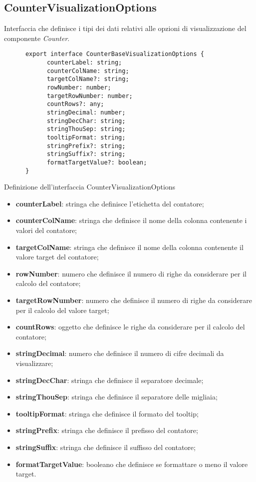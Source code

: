\subsection{CounterVisualizationOptions}
Interfaccia che definisce i tipi dei dati relativi alle opzioni di visualizzazione del componente \textit{Counter}.
\begin{listing}[H]
      \begin{verbatim}
      export interface CounterBaseVisualizationOptions {
            counterLabel: string;
            counterColName: string;
            targetColName?: string;
            rowNumber: number;
            targetRowNumber: number;
            countRows?: any;
            stringDecimal: number;
            stringDecChar: string;
            stringThouSep: string;
            tooltipFormat: string;
            stringPrefix?: string;
            stringSuffix?: string;
            formatTargetValue?: boolean;
      }
      \end{verbatim}
      \caption{Definizione dell'interfaccia CounterVisualizationOptions}
      \label{listing:counterVisualizationOptions}
\end{listing}
\begin{itemize}
      \item \textbf{counterLabel}: stringa che definisce l'etichetta del contatore;
      \item \textbf{counterColName}: stringa che definisce il nome della colonna contenente i valori del contatore;
      \item \textbf{targetColName}: stringa che definisce il nome della colonna contenente il valore target del contatore;
      \item \textbf{rowNumber}: numero che definisce il numero di righe da considerare per il calcolo del contatore;
      \item \textbf{targetRowNumber}: numero che definisce il numero di righe da considerare per il calcolo del valore target;
      \item \textbf{countRows}: oggetto che definisce le righe da considerare per il calcolo del contatore;
      \item \textbf{stringDecimal}: numero che definisce il numero di cifre decimali da visualizzare;
      \item \textbf{stringDecChar}: stringa che definisce il separatore decimale;
      \item \textbf{stringThouSep}: stringa che definisce il separatore delle migliaia;
      \item \textbf{tooltipFormat}: stringa che definisce il formato del tooltip;
      \item \textbf{stringPrefix}: stringa che definisce il prefisso del contatore;
      \item \textbf{stringSuffix}: stringa che definisce il suffisso del contatore;
      \item \textbf{formatTargetValue}: booleano che definisce se formattare o meno il valore target.
\end{itemize}

